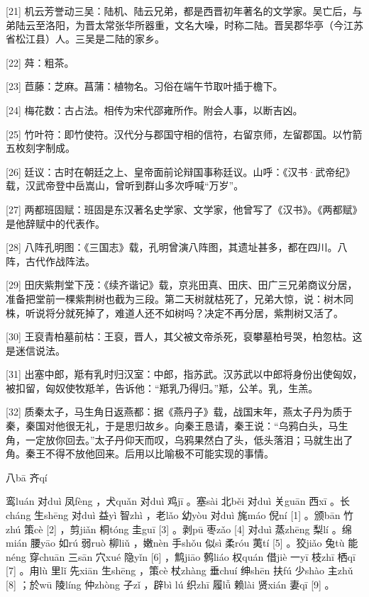 \documentclass[12pt,UTF8]{ctexbook}
\begin{document}
[21] 机云芳誉动三吴：陆机、陆云兄弟，都是西晋初年著名的文学家。吴亡后，与弟陆云至洛阳，为晋太常张华所器重，文名大噪，时称二陆。晋吴郡华亭（今江苏省松江县）人。三吴是二陆的家乡。

[22] 荈：粗茶。

[23] 苣藤：芝麻。菖蒲：植物名。习俗在端午节取叶插于檐下。

[24] 梅花数：古占法。相传为宋代邵雍所作。附会人事，以断吉凶。

[25] 竹叶符：即竹使符。汉代分与郡国守相的信符，右留京师，左留郡国。以竹箭五枚刻字制成。

[26] 廷议：古时在朝廷之上、皇帝面前论辩国事称廷议。山呼：《汉书·武帝纪》载，汉武帝登中岳嵩山，曾听到群山多次呼喊“万岁”。

[27] 两都班固赋：班固是东汉著名史学家、文学家，他曾写了《汉书》。《两都赋》是他辞赋中的代表作。

[28] 八阵孔明图：《三国志》载，孔明曾演八阵图，其遗址甚多，都在四川。八阵，古代作战阵法。

[29] 田庆紫荆堂下茂：《续齐谐记》载，京兆田真、田庆、田广三兄弟商议分居，准备把堂前一棵紫荆树也截为三段。第二天树就枯死了，兄弟大惊，说：树木同株，听说将分就死掉了，难道人还不如树吗？决定不再分居，紫荆树又活了。

[30] 王裒青柏墓前枯：王裒，晋人，其父被文帝杀死，裒攀墓柏号哭，柏忽枯。这是迷信说法。

[31] 出塞中郎，羝有乳时归汉室：中郎，指苏武。汉苏武以中郎将身份出使匈奴，被扣留，匈奴使牧羝羊，告诉他：“羝乳乃得归。”羝，公羊。乳，生羔。

[32] 质秦太子，马生角日返燕都：据《燕丹子》载，战国末年，燕太子丹为质于秦，秦国对他很无礼，于是思归故乡。向秦王恳请，秦王说：“乌鸦白头，马生角，一定放你回去。”太子丹仰天而叹，乌鸦果然白了头，低头落泪；马就生出了角。秦王不得不放他回来。后用以比喻极不可能实现的事情。





八bā 齐qí


鸾luán 对duì 凤fèng ，犬quǎn 对duì 鸡jī 。塞sài 北běi 对duì 关guān 西xī 。长cháng 生shēng 对duì 益yì 智zhì ，老lǎo 幼yòu 对duì 旄máo 倪ní [1] 。颁bān 竹zhú 策cè [2] ，剪jiǎn 桐tóng 圭guī [3] 。剥pū 枣zǎo [4] 对duì 蒸zhēng 梨lí 。绵mián 腰yāo 如rú 弱ruò 柳liǔ ，嫩nèn 手shǒu 似sì 柔róu 荑tí [5] 。狡jiǎo 兔tù 能néng 穿chuān 三sān 穴xué 隐yǐn [6] ，鹪jiāo 鹩liáo 权quán 借jiè 一yī 枝zhī 栖qī [7] 。甪lù 里lǐ 先xiān 生shēng ，策cè 杖zhàng 垂chuí 绅shēn 扶fú 少shào 主zhǔ [8] ；於wū 陵líng 仲zhòng 子zǐ ，辟bì lú 织zhī 履lǚ 赖lài 贤xián 妻qī [9] 。
\end{document}
